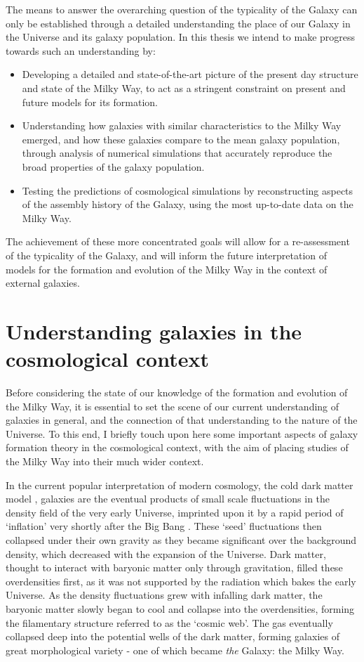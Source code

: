 The means to answer the overarching question of the typicality of the Galaxy can only be established through a detailed understanding the place of our Galaxy in the Universe and its galaxy population. In this thesis we intend to make progress towards such an understanding by:
\begin{itemize}
    \item Developing a detailed and state-of-the-art picture of the present day structure and state of the Milky Way, to act as a stringent constraint on present and future models for its formation.
    \item Understanding how galaxies with similar characteristics to the Milky Way emerged, and how these galaxies compare to the mean galaxy population, through analysis of numerical simulations that accurately reproduce the broad properties of the galaxy population.
    \item Testing the predictions of cosmological simulations by reconstructing aspects of the assembly history of the Galaxy, using the most up-to-date data on the Milky Way.
\end{itemize}
The achievement of these more concentrated goals will allow for a re-assessment of the typicality of the Galaxy, and will inform the future interpretation of models for the formation and evolution of the Milky Way in the context of external galaxies.

\section{Understanding galaxies in the cosmological context}
Before considering the state of our knowledge of the formation and evolution of the Milky Way, it is essential to set the scene of our current understanding of galaxies in general, and the connection of that understanding to the nature of the Universe. To this end, I briefly touch upon here some important aspects of galaxy formation theory in the cosmological context, with the aim of placing studies of the Milky Way into their much wider context.

In the current popular interpretation of modern cosmology, the cold dark matter model \citep[CDM, e.g.][]{1978MNRAS.183..341W}, galaxies are the eventual products of small scale fluctuations in the density field of the very early Universe, imprinted upon it by a rapid period of `inflation' very shortly after the Big Bang \citep{guth1981inflationary}. These `seed' fluctuations then collapsed under their own gravity as they became significant over the background density, which decreased with the expansion of the Universe. Dark matter, thought to interact with baryonic matter only through gravitation, filled these overdensities first, as it was not supported by the radiation which bakes the early Universe. As the density fluctuations grew with infalling dark matter, the baryonic matter slowly began to cool and collapse into the overdensities, forming the filamentary structure referred to as the `cosmic web'. The gas eventually collapsed deep into the potential wells of the dark matter, forming galaxies of great morphological variety - one of which became \emph{the} Galaxy: the Milky Way.


